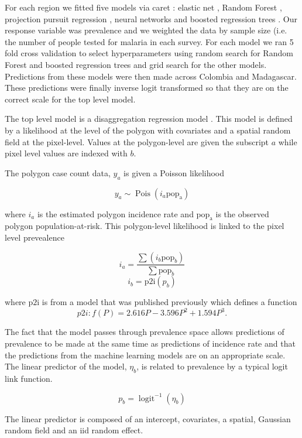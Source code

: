 \documentclass[11pt]{article}
\begin{document}
For each region we fitted five models via caret \citep{caret}: elastic net \citep{enet}, Random Forest \citep{wright2015ranger}, projection pursuit regression \citep{friedman1981projection}, neural networks \citep{nnet} and boosted regression trees \citep{gbm}.
Our response variable was prevalence and we weighted the data by sample size (i.e. the number of people tested for malaria in each survey.
For each model we ran 5 fold cross validation to select hyperparameters using random search for Random Forest and boosted regression trees and grid search for the other models. 
Predictions from these models were then made across Colombia and Madagascar.
These predictions were finally inverse logit transformed so that they are on the correct scale for the top level model.

The top level model is a disaggregation regression model \citep{sturrock2014fine, wilson2017pointless, law2018variational, taylor2017continuous, li2012log}.
This model is defined by a likelihood at the level of the polygon with covariates and a spatial random field at the pixel-level. 
Values at the polygon-level are given the subscript $a$ while pixel level values are indexed with $b$.

The polygon case count data, $y_a$ is given a Poisson likelihood

$$y_a \sim \operatorname{Pois}(i_a\mathrm{pop_a})$$

where $i_a$ is the estimated polygon incidence rate and $\mathrm{pop_a}$ is the observed polygon population-at-risk. 
This polygon-level likelihood is linked to the pixel level prevealence 

$$i_a = \frac{ \sum(i_b \mathrm{pop}_b)}{\sum  \mathrm{pop}_b} $$
$$i_b = \mathrm{p2i}(p_b)$$

where $\mathrm{p2i}$ is from a model that was published previously \citep{cameron2015defining} which defines a function
$${p2i}: f\left(P\right) = 2.616P - 3.596P^2 + 1.594P^3.$$

The fact that the model passes through prevalence space allows predictions of prevalence to be made at the same time as predictions of incidence rate and that the predictions from the machine learning models are on an appropriate scale.
The linear predictor of the model, $\eta_b$, is related to prevalence by a typical logit link function.

$$p_b = \operatorname{logit}^{-1}(\eta_b)$$

The linear predictor is composed of an intercept, covariates, a spatial, Gaussian random field and an iid random effect.
\end{document}
